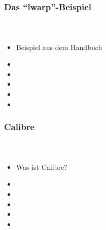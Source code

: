 \documentclass[12pt,ngerman]{beamer}
\begin{document}
\begin{frame}
\frametitle{Das \enquote{lwarp}-Beispiel}
\framesubtitle{~}

\begin{itemize}
\item Beispiel aus dem Handbuch
\item 
\item 
\item 
\item 
\item 
\end{itemize}
\end{frame}


\begin{frame}
\frametitle{Calibre}
\framesubtitle{~}

\begin{itemize}
\item Was ist Calibre?
\item 
\item 
\item 
\item 
\item 
\end{itemize}
\end{frame}
\end{document}

